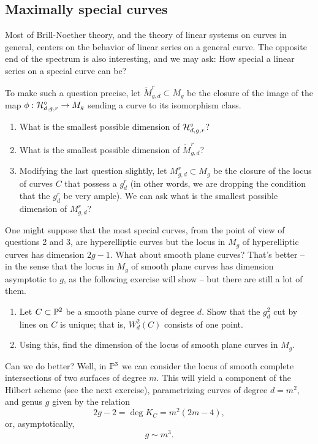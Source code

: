 \subsection{Maximally special  curves} Most of Brill-Noether theory, and the theory of linear systems on curves in general, centers on the behavior of linear series on a general curve. The opposite end of the spectrum is also interesting, and we may ask: How special  a linear series on a special curve can be?

To make such a question precise, let $\tilde M^r_{g,d} \subset M_g$ be the closure of the image of the map $\phi : \cH^\circ_{d,g,r}\to M_g$ sending a curve to its isomorphism class. 
\begin{enumerate}
\item What is the smallest possible dimension of $\cH^\circ_{d,g,r}$? 
\item What is the smallest possible dimension of $\tilde M^r_{g,d}$? 
\item Modifying the last question slightly, let $M^r_{g,d} \subset M_g$ be the closure of the locus of curves $C$ that possess a $g^r_d$ (in other words, we are dropping the condition that the $g^r_d$ be very ample). We can ask what is the smallest possible dimension of $M^r_{g,d}$?
\end{enumerate}

One might suppose that the most special curves, from the point of view of questions 2 and 3, are hyperelliptic curves but the locus in $M_g$ of hyperelliptic curves has dimension $2g-1$. What about smooth plane curves? That's better -- in the sense that the locus in $M_g$ of smooth plane curves has dimension asymptotic to $g$, as the following exercise will show -- but there are still a lot of them.

\begin{exercise}
\begin{enumerate}
\item Let $C \subset \PP^2$ be a smooth plane curve of degree $d$. Show that the $g^2_d$ cut by lines on $C$ is unique; that is, $W^2_d(C)$ consists of one point.
\item Using this, find the dimension of the locus of smooth plane curves in $M_g$.
\end{enumerate}
\end{exercise}

Can we do better?  Well, in $\PP^3$ we can consider the locus of smooth complete intersections of two surfaces of degree $m$. This will yield a component of the Hilbert scheme (see the next exercise), parametrizing curves of degree $d = m^2$, and genus $g$ given by the relation
$$
2g-2 = \deg K_C = m^2(2m-4),
$$
or, asymptotically,
$$
g \sim m^3.
$$

